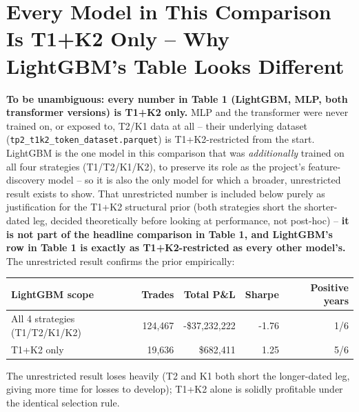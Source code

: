 \documentclass[11pt]{article}
\begin{document}
\section{Every Model in This Comparison Is T1+K2 Only -- Why LightGBM's Table Looks Different}
\textbf{To be unambiguous: every number in Table 1 (LightGBM, MLP, both transformer versions) is T1+K2
only.} MLP and the transformer were never trained on, or exposed to, T2/K1 data at all -- their underlying
dataset (\texttt{tp2\_t1k2\_token\_dataset.parquet}) is T1+K2-restricted from the start. LightGBM is the one
model in this comparison that was \emph{additionally} trained on all four strategies (T1/T2/K1/K2), to
preserve its role as the project's feature-discovery model -- so it is also the only model for which a
broader, unrestricted result exists to show. That unrestricted number is included below purely as
justification for the T1+K2 structural prior (both strategies short the shorter-dated leg, decided
theoretically before looking at performance, not post-hoc) -- \textbf{it is not part of the headline
comparison in Table 1, and LightGBM's row in Table 1 is exactly as T1+K2-restricted as every other model's.}
The unrestricted result confirms the prior empirically:
\begin{table}[H]
\centering
\begin{tabular}{lrrrr}
\toprule
LightGBM scope & Trades & Total P\&L & Sharpe & Positive years \\
\midrule
All 4 strategies (T1/T2/K1/K2) & 124,467 & -\$37,232,222 & -1.76 & 1/6 \\
T1+K2 only & 19,636 & \$682,411 & 1.25 & 5/6 \\
\bottomrule
\end{tabular}
\end{table}
The unrestricted result loses heavily (T2 and K1 both short the longer-dated leg, giving more time for
losses to develop); T1+K2 alone is solidly profitable under the identical selection rule.
\end{document}
